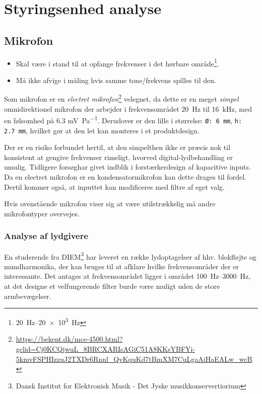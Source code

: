 \section {Styringsenhed analyse}
\subsection{Mikrofon}
\begin{itemize}
    \item Skal være i stand til at opfange frekvenser i det hørbare område\footnote{\SIrange{20}{20e3}{Hz}}. 
    \item Må ikke afvige i måling hvis samme tone/frekvens spilles til den. 
\end{itemize}

Som mikrofon er en \emph{electret mikrofon}\cite{CompleteECMGuide}\footnote{\url{https://bekent.dk/mce-4500.html?gclid=Cj0KCQjwuL_8BRCXARIsAGiC51A8KKsYBFYi-5kmvFSPHIzzuJ2TXDr6Rnnl_QvKquKd7tBmXM7CuLgaAiHaEALw_wcB}} velegnet, da dette er en meget \emph{simpel} omnidirektionel mikrofon der arbejder i frekvensområdet \SI{20}{Hz} til \SI{16}{kHz}, med en følsomhed på 6.3 \si{mV\per\pascal}. Derudover er den lille i størrelse: \texttt{Ø: \SI{6}{mm}}, \texttt{h: \SI{2.7}{mm}}, hvilket gør at den let kan monteres i et produktdesign\cite{MCE4500Datasheet}.


Der er en risiko forbundet hertil, at den simpelthen ikke er præcis nok til konsistent at gengive frekvenser rimeligt, hvorved digital-lydbehandling er umulig.
Tidligere forsøg\tbr har givet indblik i forstærkerdesign af kapacitive inputs.
Da en electret mikrofon er en kondensatormikrofon kan dette drages til fordel.
Dertil kommer også, at inputtet kan modificeres med filtre af eget valg.

Hvis ovenstående mikrofon viser sig at være utilstrækkelig må andre mikrofontyper overvejes\tbr.

\subsubsection{Analyse af lydgivere}
\tbd En studerende fra DIEM\footnote{Dansk Institut for Elektronisk Musik - Det Jyske musikkonservertiorium} har leveret en række lydoptagelser af hhv. blokfløjte og mundharmonika, der kan bruges til at afklare hvilke frekvensområder der er interessante. %
Det antages at frekvensområdet ligger i området \SIrange{100}{3000}{Hz}\cite{MimsEngNotebookFormulas}, at det designe et velfungerende filter burde være muligt uden de store armbevægelser.


